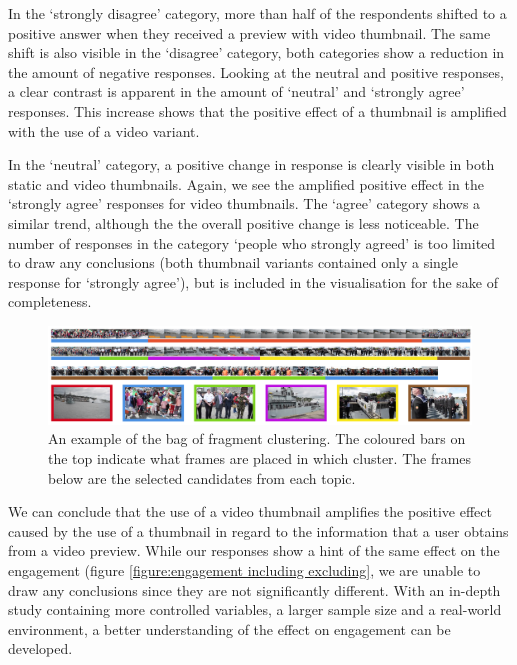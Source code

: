 \documentclass{../resources/sig-alternate-05-2015}
\begin{document}
In the `strongly disagree' category, more than half of the respondents shifted to a positive answer when they received a preview with video thumbnail. The same shift is also visible in the `disagree' category, both categories show a reduction in the amount of negative responses. Looking at the neutral and positive responses, a clear contrast is apparent in the amount of `neutral' and `strongly agree' responses. This increase shows that the positive effect of a thumbnail is amplified with the use of a video variant.

In the `neutral' category, a positive change in response is clearly visible in both static and video thumbnails. Again, we see the amplified positive effect in the `strongly agree' responses for video thumbnails. The `agree' category shows a similar trend, although the the overall positive change is less noticeable. The number of responses in the category `people who strongly agreed' is too limited to draw any conclusions (both thumbnail variants contained only a single response for `strongly agree'), but is included in the visualisation for the sake of completeness.

\begin{figure}[tb!]
	\centering
	\includegraphics[width=\textwidth]{resources/clustering.png}
	\caption{An example of the bag of fragment clustering. The coloured bars on the top indicate what frames are placed in which cluster. The frames below are the selected candidates from each topic.}
	\label{figure: topic clustering example}
\end{figure}

We can conclude that the use of a video thumbnail amplifies the positive effect caused by the use of a thumbnail in regard to the information that a user obtains from a video preview. While our responses show a hint of the same effect on the engagement (figure \ref{figure:engagement including excluding}, we are unable to draw any conclusions since they are not significantly different. With an in-depth study containing more controlled variables, a larger sample size and a real-world environment, a better understanding of the effect on engagement can be developed.
\end{document}
